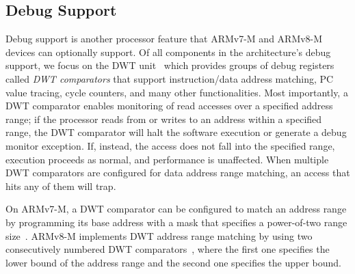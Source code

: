 \subsection{Debug Support}
\label{sec:bg:dwt}

Debug support is another processor feature that ARMv7-M and ARMv8-M
devices can optionally support.  Of all components in the architecture's
debug support, we focus on the DWT
unit~\cite{ARMv7-M:Manual,ARMv8-M:Manual} which provides groups of debug
registers called \emph{DWT
comparators} that support instruction/data address matching, PC value
tracing, cycle counters, and many other functionalities.
Most importantly, a DWT comparator enables monitoring of read accesses over a
specified address range; if the processor reads from
or writes to an address within a specified range, the DWT comparator
will halt the software execution or generate a debug monitor exception.
If, instead, the access does not fall into the specified range,
execution proceeds as normal, and performance is unaffected. When
multiple DWT comparators are configured for data address range matching,
an access that hits any of them will trap.

On ARMv7-M, a DWT comparator can be configured to match an address range
by programming its base address with a mask that specifies a power-of-two
range size~\cite{ARMv7-M:Manual}.  ARMv8-M implements DWT address range
matching by using two consecutively numbered DWT
comparators~\cite{ARMv8-M:Manual},
where the first one specifies the lower bound of the address
range and the second one specifies the upper bound.

